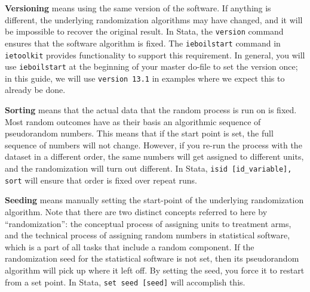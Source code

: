 \textbf{Versioning} means using the same version of the software.
If anything is different, the underlying randomization algorithms may have changed,
and it will be impossible to recover the original result.
In Stata, the \texttt{version} command ensures that the software algorithm is fixed.
The \texttt{ieboilstart} command in \texttt{ietoolkit} provides functionality to support this requirement.
In general, you will use \texttt{ieboilstart} at the beginning of your master do-file
to set the version once; in this guide, we will use
\texttt{version 13.1} in examples where we expect this to already be done.

\textbf{Sorting} means that the actual data that the random process is run on is fixed.
Most random outcomes have as their basis an algorithmic sequence of pseudorandom numbers.
This means that if the start point is set, the full sequence of numbers will not change.
However, if you re-run the process with the dataset in a different order,
the same numbers will get assigned to different units, and the randomization will turn out different.
In Stata, \texttt{isid [id\_variable], sort} will ensure that order is fixed over repeat runs.

\textbf{Seeding} means manually setting the start-point of the underlying randomization algorithm.
Note that there are two distinct concepts referred to here by ``randomization'':
the conceptual process of assigning units to treatment arms,
and the technical process of assigning random numbers in statistical software,
which is a part of all tasks that include a random component.
If the randomization seed for the statistical software is not set,
then its pseudorandom algorithm will pick up where it left off.
By setting the seed, you force it to restart from a set point.
In Stata, \texttt{set seed [seed]} will accomplish this.


